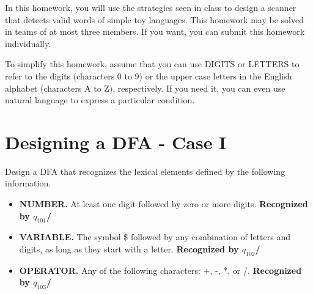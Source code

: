 \documentclass[]{article}
\begin{document}
    \setlength{\headheight}{23.10004pt}
    \addtolength{\topmargin}{-11.10004pt}    

    \noindent
    In this homework, you will use the strategies seen in class to design a scanner that detects 
    valid words of simple toy languages. This homework may be solved in teams of at most three 
    members. If you want, you can submit this homework individually.

    To simplify this homework, assume that you can use DIGITS or LETTERS to refer to the digits 
    (characters 0 to 9) or the upper case letters in the English alphabet (characters A to Z), 
    respectively. If you need it, you can even use natural language to express a particular condition.

    \section{Designing a DFA - Case I}
    Design a DFA that recognizes the lexical elements defined by the following information.

    \begin{itemize}
        \item[] \textbf{NUMBER.} At least one digit followed by zero or more digits. \textbf{Recognized by $q_{101}$/}
        \item[] \textbf{VARIABLE.} The symbol \$ followed by any combination of letters and digits, as long as they start with a letter. \textbf{Recognized by $q_{102}$/}
        \item[] \textbf{OPERATOR.} Any of the following characters: +, -, *, or /. \textbf{Recognized by $q_{103}$/}
    \end{itemize}

    \begin{center}
    \end{center}
\end{document}
